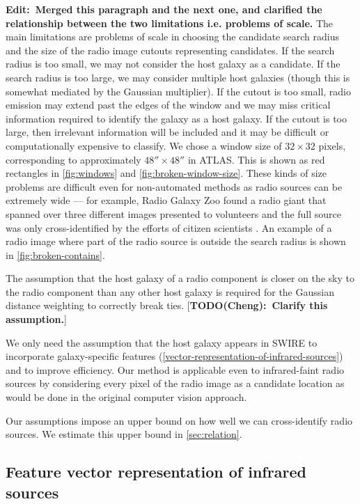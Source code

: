 \documentclass[fleqn,usenatbib,usedcolumn]{mnras}
\newcommand{\matthew}[2]{ {\color{white!20!violet}[{\bf TODO(#1):~{#2}}]} }
\newcommand{\edit}[1]{{\bf Edit:~{#1}}}
\begin{document}
    \edit{Merged this paragraph and the next one, and clarified the relationship between the two limitations i.e. problems of scale.} The main limitations are problems of scale in choosing the candidate search radius and the size of the radio image cutouts representing candidates. If the search radius is too small, we may not consider the host galaxy as a candidate. If the search radius is too large, we may consider multiple host galaxies (though this is somewhat mediated by the Gaussian multiplier). If the cutout is too small, radio emission may extend past the edges of the window and we may miss critical information required to identify the galaxy as a host galaxy. If the cutout is too large, then irrelevant information will be included and it may be difficult or computationally expensive to classify. We chose a window size of $32 \times 32$ pixels, corresponding to approximately $48'' \times 48''$ in ATLAS. This is shown as red rectangles in \autoref{fig:windows} and \autoref{fig:broken-window-size}. These kinds of size problems are difficult even for non-automated methods as radio sources can be extremely wide --- for example, Radio Galaxy Zoo found a radio giant that spanned over three different images presented to volunteers and the full source was only cross-identified by the efforts of citizen scientists \citep{banfield15}. An example of a radio image where part of the radio source is outside the search radius is shown in \autoref{fig:broken-contains}.

    The assumption that the host galaxy of a radio component is closer on the sky to the radio component than any other host galaxy is required for the Gaussian distance weighting to correctly break ties. \matthew{Cheng}{Clarify this assumption.}

    We only need the assumption that the host galaxy appears in SWIRE to
    incorporate galaxy-specific features
    (\autoref{vector-representation-of-infrared-sources}) and to improve
    efficiency. Our method is applicable even to infrared-faint radio sources
    by considering every pixel of the radio image as a candidate location as would be done in the original computer vision approach.

    Our assumptions impose an upper bound on how well we can cross-identify
    radio sources. We estimate this upper bound in \autoref{sec:relation}.

  \subsection{Feature vector representation of infrared sources}
  \label{vector-representation-of-infrared-sources}
\end{document}
